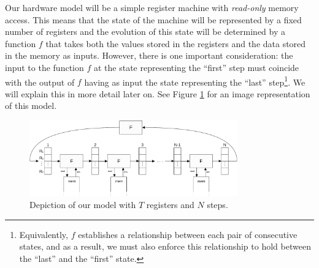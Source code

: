 Our hardware model will be a simple register machine with \textit{read-only} memory access. This means that the state of the machine will be represented by a fixed number of registers and the evolution of this state will be determined by a function $f$ that takes both the values stored in the registers and the data stored in the memory as inputs. However, there is one important consideration: the input to the function $f$ at the state representing the ``first'' step must coincide with the output of $f$ having as input the state representing the ``last'' step\footnote{Equivalently, $f$ establishes a relationship between each pair of consecutive states, and as a result, we must also enforce this relationship to hold between the ``last'' and the ``first'' state.}. We will explain this in more detail later on. See Figure \ref{fig:comp-model} for an image representation of this model.
\begin{figure}[H]
    \centering
    \includegraphics[width=0.8\textwidth]{../figures/computation-memory-diagram}
    \caption{Depiction of our model with $T$ registers and $N$ steps.}
    \label{fig:comp-model}
\end{figure}

